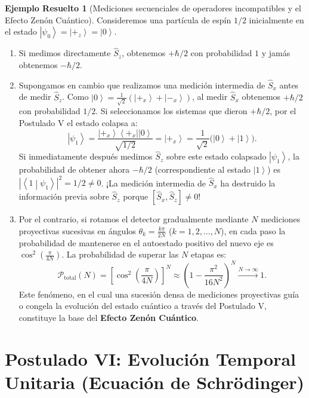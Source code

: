 \documentclass[11pt,a4paper,twoside]{report}
\theoremstyle{definition}
\newtheorem{ejemplo}{Ejemplo Resuelto}[chapter]
\theoremstyle{plain}
\theoremstyle{remark}
\newcommand{\ket}[1]{\left| #1 \right\rangle}
\newcommand{\braket}[2]{\left\langle #1 \middle| #2 \right\rangle}
\newcommand{\ketbra}[2]{\left| #1 \right\rangle\!\left\langle #2 \right|}
\newcommand{\comm}[2]{\left[ #1, #2 \right]}
\newcommand{\op}[1]{\hat{#1}}
\begin{document}
\begin{ejemplo}[Mediciones secuenciales de operadores incompatibles y el Efecto Zenón Cuántico]
Consideremos una partícula de espín $1/2$ inicialmente en el estado $\ket{\psi_0} = \ket{+_z} = \ket{0}$.
\begin{enumerate}[label=\arabic*.]
    \item Si medimos directamente $\op{S}_z$, obtenemos $+\hbar/2$ con probabilidad $1$ y jamás obtenemos $-\hbar/2$.
    \item Supongamos en cambio que realizamos una medición intermedia de $\op{S}_x$ antes de medir $\op{S}_z$. Como $\ket{0} = \frac{1}{\sqrt{2}}(\ket{+_x} + \ket{-_x})$, al medir $\op{S}_x$ obtenemos $+\hbar/2$ con probabilidad $1/2$. Si seleccionamos los sistemas que dieron $+\hbar/2$, por el Postulado V el estado colapsa a:
    \begin{equation}
        \ket{\psi_1} = \frac{\ketbra{+_x}{+_x}\ket{0}}{\sqrt{1/2}} = \ket{+_x} = \frac{1}{\sqrt{2}}\big(\ket{0} + \ket{1}\big).
    \end{equation}
    Si inmediatamente después medimos $\op{S}_z$ sobre este estado colapsado $\ket{\psi_1}$, la probabilidad de obtener ahora $-\hbar/2$ (correspondiente al estado $\ket{1}$) es $|\braket{1}{\psi_1}|^2 = 1/2 \neq 0$. ¡La medición intermedia de $\op{S}_x$ ha destruido la información previa sobre $\op{S}_z$ porque $\comm{\op{S}_x}{\op{S}_z} \neq 0$!
    \item Por el contrario, si rotamos el detector gradualmente mediante $N$ mediciones proyectivas sucesivas en ángulos $\theta_k = \frac{k\pi}{2N}$ ($k = 1, 2, \dots, N$), en cada paso la probabilidad de mantenerse en el autoestado positivo del nuevo eje es $\cos^2\left(\frac{\pi}{4N}\right)$. La probabilidad de superar las $N$ etapas es:
    \begin{equation}
        \mathcal{P}_{\text{total}}(N) = \left[ \cos^2\left(\frac{\pi}{4N}\right) \right]^N \approx \left( 1 - \frac{\pi^2}{16 N^2} \right)^N \xrightarrow{N \to \infty} 1.
    \end{equation}
    Este fenómeno, en el cual una sucesión densa de mediciones proyectivas guía o congela la evolución del estado cuántico a través del Postulado V, constituye la base del \textbf{Efecto Zenón Cuántico}.
\end{enumerate}
\end{ejemplo}

\section{Postulado VI: Evolución Temporal Unitaria (Ecuación de Schrödinger)}
\end{document}

